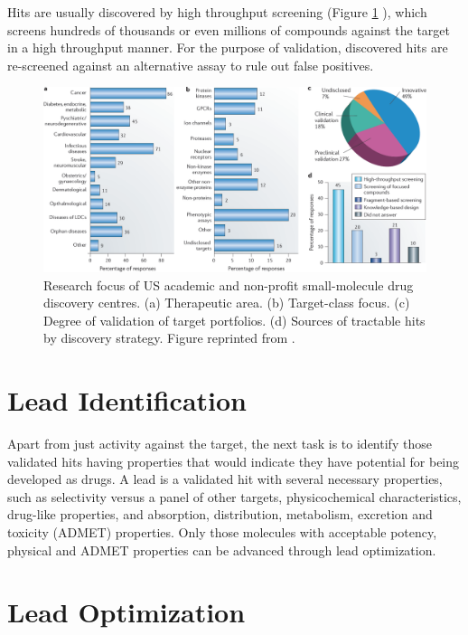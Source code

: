 Hits are usually discovered by high throughput screening \citep{795,504,736} (Figure \ref{fig:USAcademicDrugDiscoveryResearchFocus} \citep{721}), which screens hundreds of thousands or even millions of compounds against the target in a high throughput manner. For the purpose of validation, discovered hits are re-screened against an alternative assay to rule out false positives.

\begin{figure}
\centering
\includegraphics[width=\textwidth]{Background/USAcademicDrugDiscoveryResearchFocus.png}
\caption{Research focus of US academic and non-profit small-molecule drug discovery centres. (a) Therapeutic area. (b) Target-class focus. (c) Degree of validation of target portfolios. (d) Sources of tractable hits by discovery strategy. Figure reprinted from \citep{721}.}
\label{fig:USAcademicDrugDiscoveryResearchFocus}
\end{figure}

\section{Lead Identification}

Apart from just activity against the target, the next task is to identify those validated hits having properties that would indicate they have potential for being developed as drugs. A lead is a validated hit with several necessary properties, such as selectivity versus a panel of other targets, physicochemical characteristics, drug-like properties, and absorption, distribution, metabolism, excretion and toxicity (ADMET) properties. Only those molecules with acceptable potency, physical and ADMET properties can be advanced through lead optimization.

\section{Lead Optimization}

